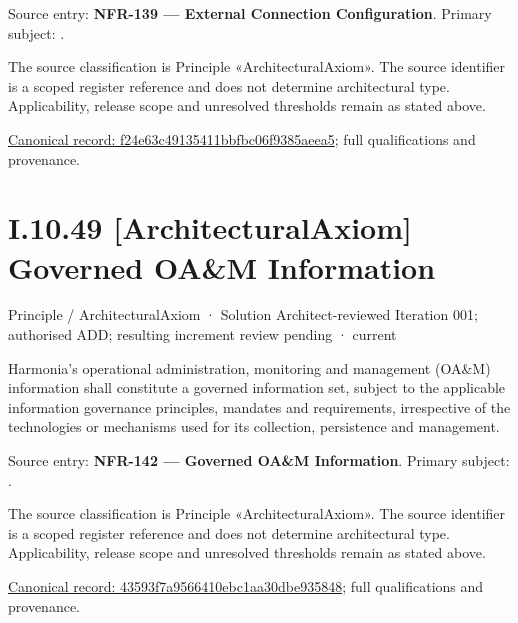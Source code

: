 Source entry: \textbf{NFR-139 — External Connection Configuration}. Primary subject: \texttt{}.



The source classification is Principle «ArchitecturalAxiom». The source identifier is a scoped register reference and does not determine architectural type. Applicability, release scope and unresolved thresholds remain as stated above.


{\footnotesize \href{../../../../../../../../continuum/motivation/principle/architectural-axiom/f24e63c49135411bbfbc06f9385aeea5.md}{Canonical record: f24e63c49135411bbfbc06f9385aeea5}; full qualifications and provenance.}\par
\section*{I.10.49 [ArchitecturalAxiom] Governed OA\&M Information}
\label{navigation:I.10.49}

\label{element:43593f7a9566410ebc1aa30dbe935848}
{\small Principle / ArchitecturalAxiom · Solution Architect-reviewed Iteration 001; authorised ADD; resulting increment review pending · current}\par

Harmonia's operational administration, monitoring and management (OA\&M) information shall constitute a governed information set, subject to the applicable information governance principles, mandates and requirements, irrespective of the technologies or mechanisms used for its collection, persistence and management.



Source entry: \textbf{NFR-142 — Governed OA\&M Information}. Primary subject: \texttt{}.



The source classification is Principle «ArchitecturalAxiom». The source identifier is a scoped register reference and does not determine architectural type. Applicability, release scope and unresolved thresholds remain as stated above.


{\footnotesize \href{../../../../../../../../continuum/motivation/principle/architectural-axiom/43593f7a9566410ebc1aa30dbe935848.md}{Canonical record: 43593f7a9566410ebc1aa30dbe935848}; full qualifications and provenance.}\par
